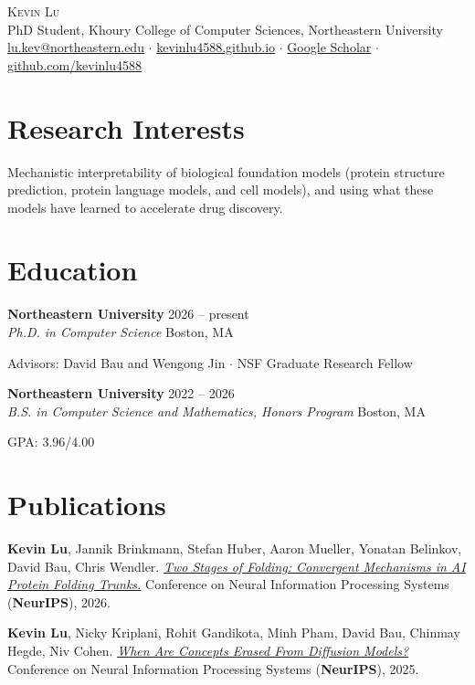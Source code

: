 \documentclass[11pt,letterpaper]{article}
\newcommand{\entry}[4]{%
  \textbf{#1} \hfill #2\\
  \textit{#3} \hfill {\small #4}\par}
\newcommand{\me}{\textbf{Kevin Lu}}
\newcommand{\gap}{\vspace{6pt}}
\begin{document}
\begin{center}
  {\LARGE\scshape Kevin Lu}\\[4pt]
  PhD Student, Khoury College of Computer Sciences, Northeastern University\\[2pt]
  \small
  \href{mailto:lu.kev@northeastern.edu}{lu.kev@northeastern.edu} \;$\cdot$\;
  \href{https://kevinlu4588.github.io}{kevinlu4588.github.io} \;$\cdot$\;
  \href{https://scholar.google.com/citations?user=0NU0lBUAAAAJ}{Google Scholar} \;$\cdot$\;
  \href{https://github.com/kevinlu4588}{github.com/kevinlu4588}
\end{center}

\section{Research Interests}
Mechanistic interpretability of biological foundation models (protein structure prediction, protein
language models, and cell models), and using what these models have learned to accelerate drug discovery.

\section{Education}
\entry{Northeastern University}{2026 -- present}{Ph.D. in Computer Science}{Boston, MA}
Advisors: David Bau and Wengong Jin \;$\cdot$\; NSF Graduate Research Fellow
\gap

\entry{Northeastern University}{2022 -- 2026}{B.S. in Computer Science and Mathematics, Honors Program}{Boston, MA}
GPA: 3.96/4.00

\section{Publications}
\begin{pubs}
  \item \me, Jannik Brinkmann, Stefan Huber, Aaron Mueller, Yonatan Belinkov, David Bau, Chris Wendler.
        \href{https://folding.baulab.info/}{\textit{Two Stages of Folding: Convergent Mechanisms in AI Protein Folding Trunks.}}
        Conference on Neural Information Processing Systems (\textbf{NeurIPS}), 2026.
  \item \me, Nicky Kriplani, Rohit Gandikota, Minh Pham, David Bau, Chinmay Hegde, Niv Cohen.
        \href{https://unerasing.baulab.info/}{\textit{When Are Concepts Erased From Diffusion Models?}}
        Conference on Neural Information Processing Systems (\textbf{NeurIPS}), 2025.
\end{pubs}
\end{document}
